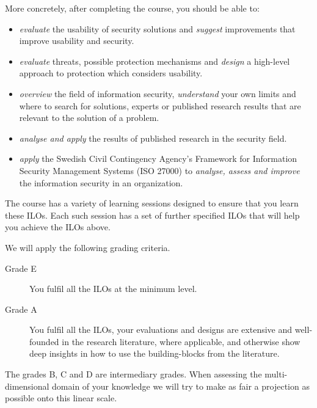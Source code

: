 More concretely, after completing the course, you should be able to:
\begin{itemize}
  \item \emph{evaluate} the usability of security solutions and \emph{suggest} 
    improvements that improve usability and security.
  \item \emph{evaluate} threats, possible protection mechanisms and 
    \emph{design} a high-level approach to protection which considers 
    usability.
  \item \emph{overview} the field of information security, \emph{understand} 
    your own limits and where to search for solutions, \eg experts or published 
    research results that are relevant to the solution of a problem.
  \item \emph{analyse and apply} the results of published research in the 
    security field.
  \item \emph{apply} the Swedish Civil Contingency Agency's Framework for 
    Information Security Management Systems (ISO 27000) to \emph{analyse, assess 
      and improve} the information security in an organization.
\end{itemize}
The course has a variety of learning sessions designed to ensure that you learn 
these \acp{ILO}.
Each such session has a set of further specified \acp{ILO} that will help you 
achieve the \acp{ILO} above.

We will apply the following grading criteria.
\begin{description}
  \item[Grade E] You fulfil all the \acp{ILO} at the minimum level.
  \item[Grade A] You fulfil all the \acp{ILO},
    your evaluations and designs are extensive and well-founded in the research 
    literature, where applicable, and otherwise show deep insights in how to 
    use the building-blocks from the literature.
\end{description}
The grades B, C and D are intermediary grades.
When assessing the multi-dimensional domain of your knowledge we will try to 
make as fair a projection as possible onto this linear scale.

